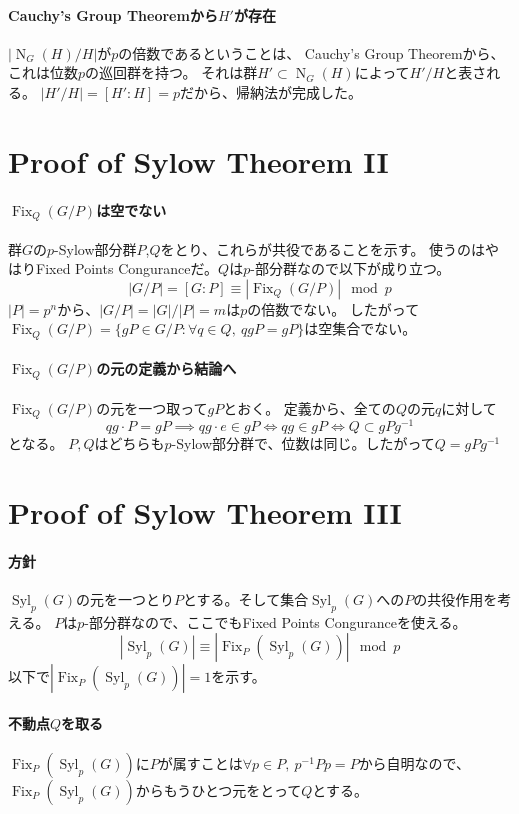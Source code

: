 \documentclass[a4paper]{jsarticle}
\newcommand{\Fix}{\operatorname{Fix}}
\newcommand{\Norm}{\operatorname{N}}
\newcommand{\Syl}{\operatorname{Syl}}
\begin{document}
    \paragraph{Cauchy's Group Theoremから$H'$が存在}
    $|\Norm_G(H)/H|$が$p$の倍数であるということは、
    Cauchy's Group Theoremから、これは位数$p$の巡回群を持つ。
    それは群$H' \subset \Norm_G(H)$によって$H'/H$と表される。
    $|H'/H|=[H':H]=p$だから、帰納法が完成した。
    

    \section{Proof of Sylow Theorem II}
    \paragraph{$\Fix_Q(G/P)$は空でない}
    群$G$の$p$-Sylow部分群$P$,$Q$をとり、これらが共役であることを示す。
    使うのはやはりFixed Points Conguranceだ。$Q$は$p$-部分群なので以下が成り立つ。
    \[ |G/P|=[G:P] \equiv |\Fix_Q(G/P)| \mod p \]
    $|P|=p^n$から、$|G/P|=|G|/|P|=m$は$p$の倍数でない。
    したがって$\Fix_Q(G/P)=\{ gP \in G/P : \forall q \in Q,~ qgP=gP \}$は空集合でない。

    \paragraph{$\Fix_Q(G/P)$の元の定義から結論へ}
    $\Fix_Q(G/P)$の元を一つ取って$gP$とおく。
    定義から、全ての$Q$の元$q$に対して
    \[ qg \cdot P=gP \implies qg \cdot e \in gP \iff qg \in gP \iff Q \subset gPg^{-1} \]となる。
    $P,Q$はどちらも$p$-Sylow部分群で、位数は同じ。したがって$Q=gPg^{-1}$
    

    \section{Proof of Sylow Theorem III}
    \paragraph{方針}
    $\Syl_p(G)$の元を一つとり$P$とする。そして集合$\Syl_p(G)$への$P$の共役作用を考える。
    $P$は$p$-部分群なので、ここでもFixed Points Conguranceを使える。
    \[ |\Syl_p(G)| \equiv |\Fix_P(\Syl_p(G))| \mod p\]
    以下で$|\Fix_P(\Syl_p(G))|=1$を示す。

    \paragraph{不動点$Q$を取る}
    $\Fix_P(\Syl_p(G))$に$P$が属すことは$\forall p \in P,~ p^{-1}Pp=P$から自明なので、
    $\Fix_P(\Syl_p(G))$からもうひとつ元をとって$Q$とする。
\end{document}
